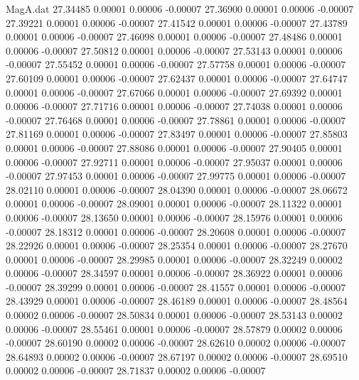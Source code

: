 \begin{filecontents}{MagA.dat}
  27.34485    0.00001    0.00006   -0.00007
  27.36900    0.00001    0.00006   -0.00007
  27.39221    0.00001    0.00006   -0.00007
  27.41542    0.00001    0.00006   -0.00007
  27.43789    0.00001    0.00006   -0.00007
  27.46098    0.00001    0.00006   -0.00007
  27.48486    0.00001    0.00006   -0.00007
  27.50812    0.00001    0.00006   -0.00007
  27.53143    0.00001    0.00006   -0.00007
  27.55452    0.00001    0.00006   -0.00007
  27.57758    0.00001    0.00006   -0.00007
  27.60109    0.00001    0.00006   -0.00007
  27.62437    0.00001    0.00006   -0.00007
  27.64747    0.00001    0.00006   -0.00007
  27.67066    0.00001    0.00006   -0.00007
  27.69392    0.00001    0.00006   -0.00007
  27.71716    0.00001    0.00006   -0.00007
  27.74038    0.00001    0.00006   -0.00007
  27.76468    0.00001    0.00006   -0.00007
  27.78861    0.00001    0.00006   -0.00007
  27.81169    0.00001    0.00006   -0.00007
  27.83497    0.00001    0.00006   -0.00007
  27.85803    0.00001    0.00006   -0.00007
  27.88086    0.00001    0.00006   -0.00007
  27.90405    0.00001    0.00006   -0.00007
  27.92711    0.00001    0.00006   -0.00007
  27.95037    0.00001    0.00006   -0.00007
  27.97453    0.00001    0.00006   -0.00007
  27.99775    0.00001    0.00006   -0.00007
  28.02110    0.00001    0.00006   -0.00007
  28.04390    0.00001    0.00006   -0.00007
  28.06672    0.00001    0.00006   -0.00007
  28.09001    0.00001    0.00006   -0.00007
  28.11322    0.00001    0.00006   -0.00007
  28.13650    0.00001    0.00006   -0.00007
  28.15976    0.00001    0.00006   -0.00007
  28.18312    0.00001    0.00006   -0.00007
  28.20608    0.00001    0.00006   -0.00007
  28.22926    0.00001    0.00006   -0.00007
  28.25354    0.00001    0.00006   -0.00007
  28.27670    0.00001    0.00006   -0.00007
  28.29985    0.00001    0.00006   -0.00007
  28.32249    0.00002    0.00006   -0.00007
  28.34597    0.00001    0.00006   -0.00007
  28.36922    0.00001    0.00006   -0.00007
  28.39299    0.00001    0.00006   -0.00007
  28.41557    0.00001    0.00006   -0.00007
  28.43929    0.00001    0.00006   -0.00007
  28.46189    0.00001    0.00006   -0.00007
  28.48564    0.00002    0.00006   -0.00007
  28.50834    0.00001    0.00006   -0.00007
  28.53143    0.00002    0.00006   -0.00007
  28.55461    0.00001    0.00006   -0.00007
  28.57879    0.00002    0.00006   -0.00007
  28.60190    0.00002    0.00006   -0.00007
  28.62610    0.00002    0.00006   -0.00007
  28.64893    0.00002    0.00006   -0.00007
  28.67197    0.00002    0.00006   -0.00007
  28.69510    0.00002    0.00006   -0.00007
  28.71837    0.00002    0.00006   -0.00007

\end{filecontents}
